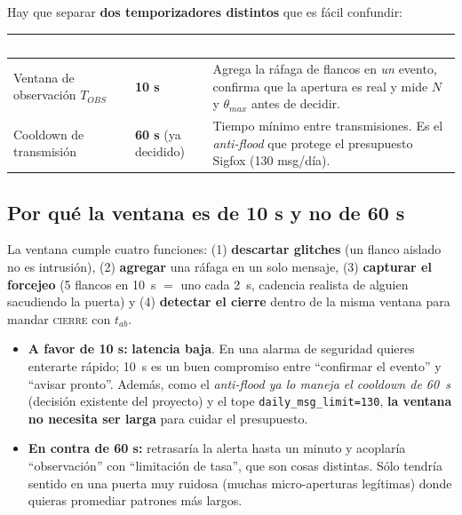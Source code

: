 \documentclass[11pt,a4paper]{article}
\newcommand{\dec}[1]{\textcolor{Green0G}{\textbf{#1}}}
\newcommand{\desc}[1]{\textcolor{Red0G}{\textbf{#1}}}
\begin{document}
Hay que separar \textbf{dos temporizadores distintos} que es fácil confundir:

\begin{center}
\renewcommand{\arraystretch}{1.3}
\begin{tabularx}{\linewidth}{@{}l l X@{}}
\toprule
\rowcolor{Indigo0G}
\textcolor{white}{\textbf{Temporizador}} & \textcolor{white}{\textbf{Valor}} &
\textcolor{white}{\textbf{Propósito}} \\
\midrule
Ventana de observación $T_{OBS}$ & \textbf{10 s} &
Agrega la ráfaga de flancos en \emph{un} evento, confirma que la apertura es real
y mide $N$ y $\theta_{max}$ antes de decidir. \\
\rowcolor{Light0G}
Cooldown de transmisión & \textbf{60 s} (ya decidido) &
Tiempo mínimo entre transmisiones. Es el \emph{anti-flood} que protege el
presupuesto Sigfox (130 msg/día). \\
\bottomrule
\end{tabularx}
\end{center}

\subsection{Por qué la ventana es de 10 s y no de 60 s}

La ventana cumple cuatro funciones: (1) \textbf{descartar glitches} (un flanco
aislado no es intrusión), (2) \textbf{agregar} una ráfaga en un solo mensaje,
(3) \textbf{capturar el forcejeo} (5 flancos en 10~s $=$ uno cada 2~s, cadencia
realista de alguien sacudiendo la puerta) y (4) \textbf{detectar el cierre}
dentro de la misma ventana para mandar \textsc{cierre} con $t_{ab}$.

\begin{itemize}[leftmargin=1.4em,itemsep=0.3em]
  \item \dec{A favor de 10 s:} \textbf{latencia baja}. En una alarma de
  seguridad quieres enterarte rápido; 10~s es un buen compromiso entre ``confirmar
  el evento'' y ``avisar pronto''. Además, como el \emph{anti-flood ya lo maneja
  el cooldown de 60~s} (decisión existente del proyecto) y el tope
  \texttt{daily\_msg\_limit=130}, \textbf{la ventana no necesita ser larga} para
  cuidar el presupuesto.
  \item \desc{En contra de 60 s:} retrasaría la alerta hasta un minuto y
  acoplaría ``observación'' con ``limitación de tasa'', que son cosas distintas.
  Sólo tendría sentido en una puerta muy ruidosa (muchas micro-aperturas
  legítimas) donde quieras promediar patrones más largos.
\end{itemize}
\end{document}
